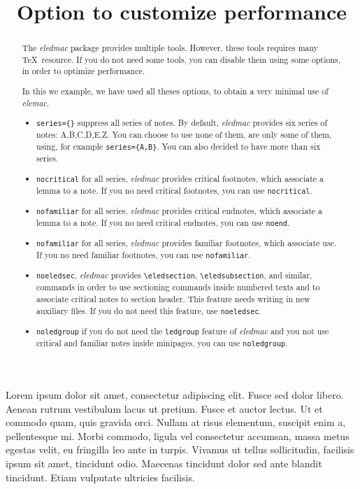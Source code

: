 \documentclass{article}
\begin{document}
\begin{english}
\title{Option to customize performance}
\maketitle
\begin{abstract}
The \emph{eledmac} package provides multiple tools. However, these tools requires many \TeX\ resource. If you do not need some tools, you can disable them using some options, in order to optimize performance.

In this we example, we have used all theses options, to obtain a very minimal use of \emph{elemac}.

\begin{itemize}
  \item\verb+series={}+ suppress all series of notes. By default, \emph{eledmac} provides six series of notes: A,B,C,D,E,Z. You can choose to use none of them, are only some of them, using, for example \verb+series={A,B}+. You can also decided to have more than six series.
  \item\verb+nocritical+ for all series, \emph{eledmac} provides critical footnotes, which associate a lemma to a note. If you no need critical footnotes, you can use \verb+nocritical+.
  \item\verb+nofamiliar+ for all series, \emph{eledmac} provides critical endnotes, which associate a lemma to a note. If you no need critical endnotes, you can use \verb+noend+.
  \item\verb+nofamiliar+ for all series, \emph{eledmac} provides familiar footnotes, which associate use. If you no need familiar footnotes, you can use \verb+nofamiliar+.    
  \item\verb+noeledsec+, \emph{eledmac} provides \verb+\eledsection+, \verb+\eledsubsection+, and similar, commands in order to use sectioning commands inside numbered texts and to associate critical notes to section header. This feature needs writing in new auxiliary files. If you do not need this feature, use \verb+noeledsec+.
  \item\verb+noledgroup+ if you do not need the \verb+ledgroup+ feature of \emph{eledmac} and you not use critical and familiar notes inside minipages, you can use   \verb+noledgroup+.
\end{itemize}


\end{abstract}
\end{english}

\beginnumbering
\pstart
Lorem ipsum  dolor sit amet, consectetur adipiscing elit. Fusce sed dolor libero. Aenean rutrum vestibulum lacus ut pretium. Fusce et auctor lectus. Ut et commodo quam, quis gravida orci. Nullam at risus elementum, suscipit enim a, pellentesque mi. Morbi commodo, ligula vel consectetur accumsan, massa metus egestas velit, eu fringilla leo ante in turpis. Vivamus ut tellus sollicitudin, facilisis ipsum sit amet, tincidunt odio. Maecenas tincidunt dolor sed ante blandit tincidunt. Etiam vulputate ultricies facilisis.
\pend
\endnumbering
\end{document}
